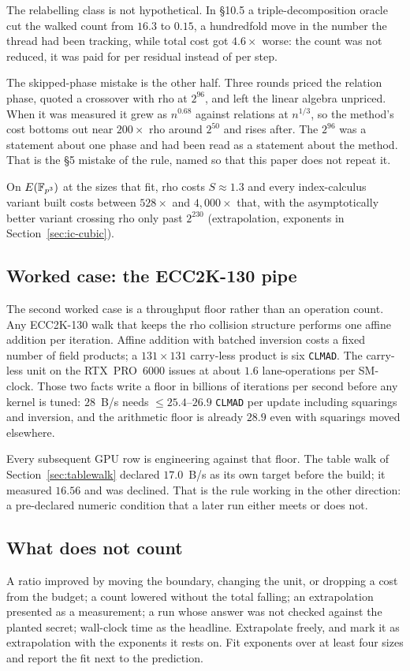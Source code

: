 The relabelling class is not hypothetical. In §10.5 a
triple-decomposition oracle cut the walked count from $16.3$ to
$0.15$, a hundredfold move in the number the thread had been tracking,
while total cost got $4.6\times$ worse: the count was not reduced, it
was paid for per residual instead of per step.

The skipped-phase mistake is the other half. Three rounds priced the
relation phase, quoted a crossover with rho at $2^{96}$, and left the
linear algebra unpriced. When it was measured it grew as $n^{0.68}$
against relations at $n^{1/3}$, so the method's cost bottoms out near
$200\times$ rho around $2^{50}$ and rises after. The $2^{96}$ was a
statement about one phase and had been read as a statement about the
method. That is the §5 mistake of the rule, named so that this paper
does not repeat it.

On $E(\mathbb{F}_{p^3})$ at the sizes that fit, rho costs $S\approx 1.3$ and
every index-calculus variant built costs between $528\times$ and
$4{,}000\times$ that, with the asymptotically better variant crossing
rho only past $2^{230}$ (extrapolation, exponents in
Section~\ref{sec:ic-cubic}).

\subsection{Worked case: the ECC2K-130 pipe}
\label{sec:method-pipe}

The second worked case is a throughput floor rather than an operation
count. Any ECC2K-130 walk that keeps the rho collision structure
performs one affine addition per iteration. Affine addition with
batched inversion costs a fixed number of field products; a $131\times
131$ carry-less product is six \texttt{CLMAD}. The carry-less unit on
the RTX~PRO~6000 issues at about $1.6$ lane-operations per SM-clock.
Those two facts write a floor in billions of iterations per second
before any kernel is tuned: $28$~B/s needs $\le 25.4$--$26.9$
\texttt{CLMAD} per update including squarings and inversion, and the
arithmetic floor is already $28.9$ even with squarings moved
elsewhere.

Every subsequent GPU row is engineering against that floor. The table
walk of Section~\ref{sec:tablewalk} declared $17.0$~B/s as its own
target before the build; it measured $16.56$ and was declined. That is
the rule working in the other direction: a pre-declared numeric
condition that a later run either meets or does not.

\subsection{What does not count}

A ratio improved by moving the boundary, changing the unit, or
dropping a cost from the budget; a count lowered without the total
falling; an extrapolation presented as a measurement; a run whose
answer was not checked against the planted secret; wall-clock time as
the headline. Extrapolate freely, and mark it as extrapolation with
the exponents it rests on. Fit exponents over at least four sizes and
report the fit next to the prediction.
